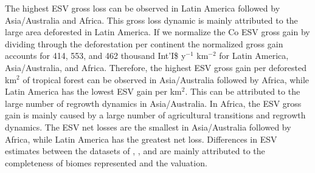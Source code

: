 		The highest \ac{ESV} gross loss can be observed in Latin America followed by Asia/Australia and Africa. This gross loss dynamic is mainly attributed to the large area deforested in Latin America. If we normalize the Co \ac{ESV} gross gain by dividing through the deforestation per continent the normalized gross gain accounts for 414, 553, and 462 thousand Int'I\$ y$^{-1}$ km$^{-2}$ for Latin America, Asia/Australia, and Africa. Therefore, the highest \ac{ESV} gross gain per deforested km$^2$ of tropical forest can be observed in Asia/Australia followed by Africa, while Latin America has the lowest \ac{ESV} gain per km$^2$. This can be attributed to the large number of regrowth dynamics in Asia/Australia. In Africa, the \ac{ESV} gross gain is mainly caused by a large number of agricultural transitions and regrowth dynamics. The \ac{ESV} net losses are the smallest in Asia/Australia followed by Africa, while Latin America has the greatest net loss. Differences in \ac{ESV} estimates between the datasets of \citet{Costanza2014}, \citet{Groot2012}, and \citet{Siikamaki2015} are mainly attributed to the completeness of biomes represented and the valuation.